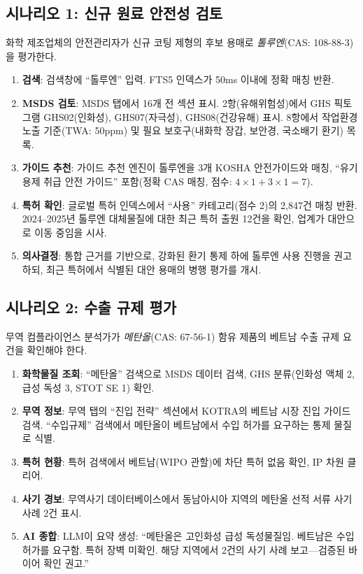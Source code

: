 \documentclass[preprint,12pt]{elsarticle}
\begin{document}
\subsection{시나리오 1: 신규 원료 안전성 검토}

화학 제조업체의 안전관리자가 신규 코팅 제형의 후보 용매로 \emph{톨루엔}(CAS: 108-88-3)을 평가한다.

\begin{enumerate}
  \item \textbf{검색}: 검색창에 ``톨루엔'' 입력. FTS5 인덱스가 50ms 이내에 정확 매칭 반환.
  \item \textbf{MSDS 검토}: MSDS 탭에서 16개 전 섹션 표시. 2항(유해위험성)에서 GHS 픽토그램 GHS02(인화성), GHS07(자극성), GHS08(건강유해) 표시. 8항에서 작업환경 노출 기준(TWA: 50ppm) 및 필요 보호구(내화학 장갑, 보안경, 국소배기 환기) 목록.
  \item \textbf{가이드 추천}: 가이드 추천 엔진이 톨루엔을 3개 KOSHA 안전가이드와 매칭, ``유기용제 취급 안전 가이드'' 포함(정확 CAS 매칭, 점수: $4 \times 1 + 3 \times 1 = 7$).
  \item \textbf{특허 확인}: 글로벌 특허 인덱스에서 ``사용'' 카테고리(점수 2)의 2,847건 매칭 반환. 2024--2025년 톨루엔 대체물질에 대한 최근 특허 출원 12건을 확인, 업계가 대안으로 이동 중임을 시사.
  \item \textbf{의사결정}: 통합 근거를 기반으로, 강화된 환기 통제 하에 톨루엔 사용 진행을 권고하되, 최근 특허에서 식별된 대안 용매의 병행 평가를 개시.
\end{enumerate}

\subsection{시나리오 2: 수출 규제 평가}

무역 컴플라이언스 분석가가 \emph{메탄올}(CAS: 67-56-1) 함유 제품의 베트남 수출 규제 요건을 확인해야 한다.

\begin{enumerate}
  \item \textbf{화학물질 조회}: ``메탄올'' 검색으로 MSDS 데이터 검색, GHS 분류(인화성 액체 2, 급성 독성 3, STOT SE 1) 확인.
  \item \textbf{무역 정보}: 무역 탭의 ``진입 전략'' 섹션에서 KOTRA의 베트남 시장 진입 가이드 검색. ``수입규제'' 검색에서 메탄올이 베트남에서 수입 허가를 요구하는 통제 물질로 식별.
  \item \textbf{특허 현황}: 특허 검색에서 베트남(WIPO 관할)에 차단 특허 없음 확인, IP 차원 클리어.
  \item \textbf{사기 경보}: 무역사기 데이터베이스에서 동남아시아 지역의 메탄올 선적 서류 사기 사례 2건 표시.
  \item \textbf{AI 종합}: LLM이 요약 생성: ``메탄올은 고인화성 급성 독성물질임. 베트남은 수입 허가를 요구함. 특허 장벽 미확인. 해당 지역에서 2건의 사기 사례 보고---검증된 바이어 확인 권고.''
\end{enumerate}
\end{document}
